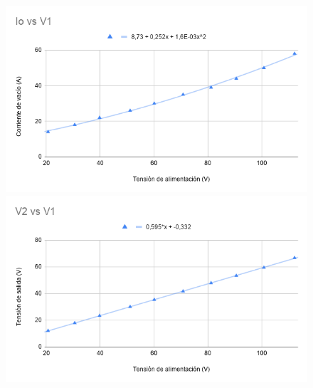 \documentclass[12pt]{article}
\begin{document}
\begin{enumerate}
    \begin{figure}[H]
    \centering
        \begin{minipage}{.5\textwidth}
          \centering
          \includegraphics[width=.95\linewidth]{IovsV1.png}
          \captionsetup{labelformat=empty}
        \end{minipage}%
        \begin{minipage}{.5\textwidth}
          \centering
          \includegraphics[width=1.0\linewidth]{V2vsV1.png}
          \captionsetup{labelformat=empty}
        \end{minipage}
    \end{figure}
    

\end{enumerate}
\end{document}

